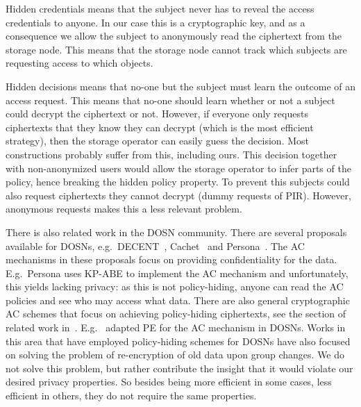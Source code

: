 Hidden credentials means that the subject never has to reveal the access 
credentials to anyone.
In our case this is a cryptographic key, and as a consequence we allow the 
subject to anonymously read the ciphertext from the storage node.
This means that the storage node cannot track which subjects are requesting 
access to which objects.

Hidden decisions means that no-one but the subject must learn the outcome of an 
access request.
This means that no-one should learn whether or not a subject could decrypt the 
ciphertext or not.
However, if everyone only requests ciphertexts that they know they can decrypt 
(which is the most efficient strategy), then the storage operator can easily 
guess the decision.
Most constructions probably suffer from this, including ours.
This decision together with non-anonymized users would allow the storage 
operator to infer parts of the policy, hence breaking the hidden policy 
property.
To prevent this subjects could also request ciphertexts they cannot decrypt 
(dummy requests of \ac{PIR}).
However, anonymous requests makes this a less relevant problem.


There is also related work in the \ac{DOSN} community.
There are several proposals available for \acp{DOSN}, e.g.\ 
DECENT~\cite{DECENT}, Cachet~\cite{Cachet} and Persona~\cite{Persona}.
The \ac{AC} mechanisms in these proposals focus on providing confidentiality 
for the data.
E.g.\ Persona uses \ac{KP-ABE} to implement the \ac{AC} mechanism and
unfortunately, this yields lacking privacy: as this is not policy-hiding, 
anyone can read the \ac{AC} policies and see who may access what data.
There are also general cryptographic \ac{AC} schemes that focus on achieving 
policy-hiding ciphertexts, see the section of related work 
in~\cite{TowardsPPACwHPHCHD}.
E.g.\ \citet{PEAC} adapted \ac{PE} for the \ac{AC} mechanism in \acp{DOSN}.
Works in this area that have employed policy-hiding schemes for \acp{DOSN} have
also focused on solving the problem of re-encryption of old data upon group 
changes.
We do not solve this problem, but rather contribute the insight that it would 
violate our desired privacy properties.
So besides being more efficient in some cases, less efficient in others, they 
do not require the same properties.


